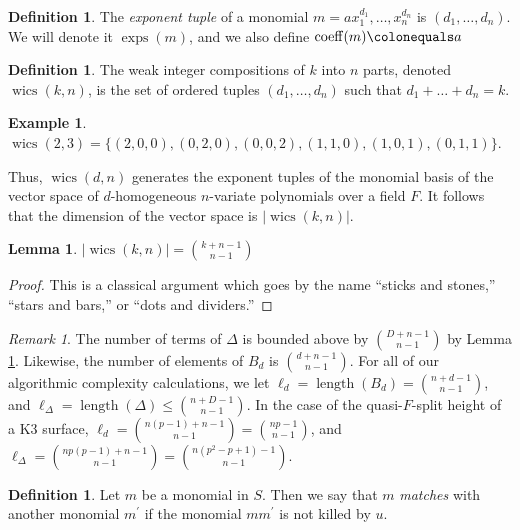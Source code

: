 \documentclass[a4paper]{article}
\newtheorem{lem}[thm]{Lemma}
\theoremstyle{definition}
\newtheorem{defn}[thm]{Definition}
\newtheorem{ex}[thm]{Example}
\theoremstyle{remark}
\newtheorem{rmk}[thm]{Remark}
\newcommand{\exps}{\operatorname{exps}}
\newcommand{\wics}{\operatorname{wics}}
\newcommand{\coeff}{\operatorname{coeff}}
\newcommand{\length}{\operatorname{length}}
\begin{document}
\begin{defn}
    \label{def:poly:nota}
    The \textit{exponent tuple} of a monomial 
    $m = ax_{1}^{d_1}, \dots, x_{n}^{d_n}$ is $(d_1, \dots, d_n)$. 
	We will denote it $\exps(m)$, and we also 
    define $\coeff(m) \colonequals a$
\end{defn}

\begin{defn}
    The weak integer compositions of $k$ into $n$ parts, 
    denoted $\wics(k, n)$, is the set of ordered tuples 
	\((d_{1}, \ldots, d_{n})\) such that 
    \(d_{1} + \ldots + d_{n} = k\).
\end{defn}

\begin{ex}
    $\wics(2, 3) = \lbrace (2, 0, 0), (0, 2, 0), (0, 0, 2), (1, 1, 0), (1, 0, 1), (0, 1, 1) \rbrace$.
\end{ex}

Thus, $\wics(d, n)$ generates the exponent tuples of the 
monomial basis of the vector space of $d$-homogeneous 
$n$-variate polynomials over a field $F$.
It follows that the dimension of the vector space is $|\wics(k, n)|$.

\begin{lem}
    \label{lem:wics:size}
    $|\wics(k, n)| = \binom{k + n - 1}{n - 1}$
\end{lem}

\begin{proof}
	This is a classical argument which goes by the 
    name ``sticks and stones,'' ``stars and bars,'' or 
    ``dots and dividers.''
\end{proof}


\begin{rmk}
    The number of terms of \(\Delta\) is bounded 
    above by \(\binom{D+n-1}{n-1}\) by Lemma \ref{lem:wics:size}.
    Likewise, the number of elements of 
    \(B_{d}\) is \(\binom{d+n-1}{n-1}\).
    For all of our algorithmic complexity calculations, 
    we let $\ell_{d} = \length(B_{d}) = \binom{n + d - 1}{n - 1}$, 
    and $\ell_{\Delta} = \length(\Delta) \leq \binom{n + D - 1}{n - 1}$.
    In the case of the quasi-\(F\)-split height of a K3 surface, 
    $\ell_{d} = \binom{n(p - 1) + n - 1}{n - 1} = \binom{np - 1}{n - 1}$, 
    and $\ell_{\Delta} = \binom{np(p - 1) + n - 1}{n - 1} = \binom{n(p^2 - p + 1) - 1}{n - 1}$.
\end{rmk}

\begin{defn}
	Let \(m\) be a monomial in \(S\). 
	Then we say that \(m\) \textit{matches}
	with another monomial \(m^{\prime}\) 
	if the monomial \(mm^{\prime}\) is
	not killed by \(u\).
\end{defn}
\end{document}
